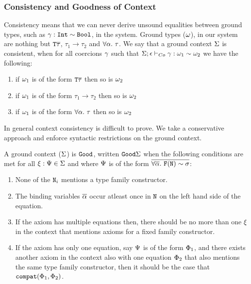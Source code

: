 \documentclass[format=sigplan,manuscript,review,screen,nonacm,margin=1in]{acmart}
\begin{document}
\subsubsection{Consistency and Goodness of Context}\label{subsec:tf-closed-consistency}
Consistency means that we can never derive unsound equalities between ground types,
such as $\gamma:\texttt{Int}\mathrel{\sim}\texttt{Bool}$, in the system. Ground types ($\omega$), in our system are
nothing but $\texttt{T}\overline{\tau}$, $\tau_1\to\tau_2$ and $\forall\alpha.~\tau$.
We say that a ground context $\Sigma$ is consistent, when for all coercions $\gamma$
such that $\Sigma;\epsilon \vdash_{Co} \gamma : \omega_1 \mathrel{\sim} \omega_2$ we have the following:
\begin{enumerate}
\item if $\omega_1$ is of the form $\texttt{T}\overline{\tau}$ then so is $\omega_2$
\item if $\omega_1$ is of the form $\tau_1\to\tau_2$ then so is $\omega_2$
\item if $\omega_1$ is of the form $\forall\alpha.~\tau$ then so is $\omega_2$
\end{enumerate}
In general context consistency is difficult to prove. We take a conservative approach
and enforce syntactic restrictions on the ground context.
\begin{property}[$\Good~\GEnv$]
  A ground context ($\Sigma$) is $\texttt{Good}$, written $\texttt{Good}\Sigma$ when
  the following conditions are met for all $\xi_{}{}:\Psi\in\Sigma$ and
  where $\Psi$ is of the form $\overline{\forall\overline{\alpha}.~\texttt{F}(\texttt{N})\mathrel{\sim}\sigma}$:
  \begin{enumerate}
  \item None of the $\texttt{N}_i$ mentions a type family constructor.
  \item The binding variables $\overline{\alpha}$ occur atleast once in $\texttt{N}$ on the left hand side of the equation.
  \item If the axiom has multiple equations then, there should be no more than one $\xi_{}{}$
    in the context that mentions axioms for a fixed family constructor.
  \item If the axiom has only one equation, say $\Psi$ is of the form $\Phi_1$,
    and there exists another axiom in the context
    also with one equation $\Phi_2$ that also mentions the same type family constructor, then
    it should be the case that $\texttt{compat}(\Phi_1, \Phi_2)$.
  \end{enumerate}
\end{property}
\end{document}
